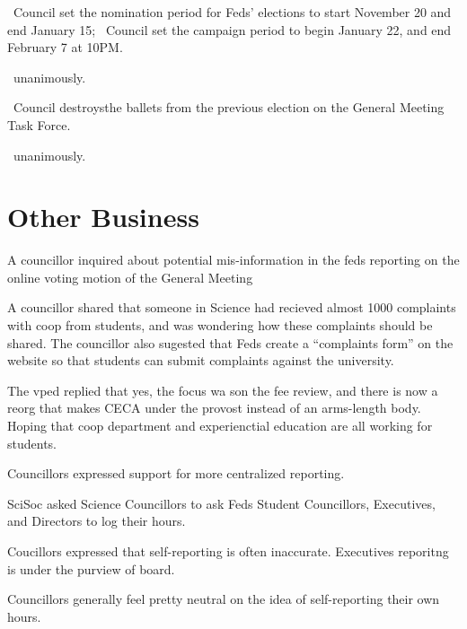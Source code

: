 \begin{motion}
    \birt\ Council set the nomination period for Feds' elections to start 
    November 20 and end January 15; 
    \bifrt\ Council set the campaign period to begin January 22, and 
    end February 7 at 10PM.%
    \movers{\antonio}{\senecca}

    \carries\ unanimously.
\end{motion}

\begin{motion}
    \birt\ Council destroysthe ballets from the previous election on 
    the General Meeting Task Force. 
    \movers{\brian}{\jason}

    \carries\ unanimously.
\end{motion}

\section*{Other Business}

\begin{information}
    A councillor inquired about potential mis-information in the feds reporting
    on the online voting motion of the General Meeting
\end{information}

\begin{information}
    A councillor shared that someone in Science had recieved almost 1000 complaints
    with coop from students, and was wondering how these complaints should be 
    shared. The councillor also sugested that Feds create a ``complaints form''
    on the website so that students can submit complaints against the university.

    The vped replied that yes, the focus wa son the fee review, and there is now
    a reorg that makes CECA under the provost instead of an arms-length body. 
    Hoping that coop department and experienctial education are all working for 
    students. 

    Councillors expressed support for more centralized reporting. 
\end{information}

\begin{information}
    SciSoc asked Science Councillors to ask Feds Student Councillors, 
    Executives, and Directors to log their hours. 

    Coucillors expressed that self-reporting is often inaccurate. Executives
    reporitng is under the purview of board. 

    Councillors generally feel pretty neutral on the idea of self-reporting 
    their own hours. 
\end{information}

